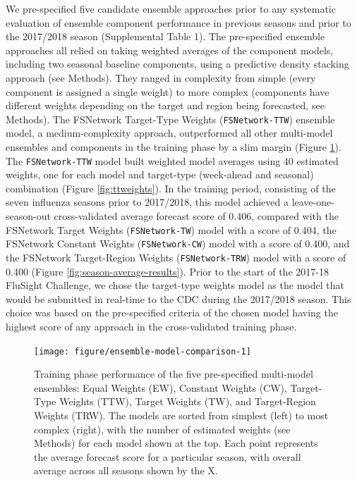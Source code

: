 \documentclass{article}\usepackage[]{graphicx}\usepackage[]{color}
\newenvironment{knitrout}{}{} %
\begin{document}
We pre-specified five candidate ensemble approaches prior to any systematic evaluation of ensemble component performance in previous seasons and prior to the 2017/2018 season (Supplemental Table 1).\cite{Reich2017github} 
The pre-specified ensemble approaches all relied on taking weighted averages of the component models, including two seasonal baseline components, using a predictive density stacking approach (see Methods).
They ranged in complexity from simple (every component is assigned a single weight) to more complex (components have different weights depending on the target and region being forecasted, see Methods).
The FSNetwork Target-Type Weights ({\tt FSNetwork-TTW}) ensemble model, a medium-complexity approach, outperformed all other multi-model ensembles and components in the training phase by a slim margin (Figure \ref{fig:ensemble-model-comparison}). 
The {\tt FSNetwork-TTW} model built weighted model averages using 40 estimated weights, one for each model and target-type (week-ahead and seasonal) combination (Figure \ref{fig:ttweights}).
In the training period, consisting of the seven influenza seasons prior to 2017/2018, this model achieved a leave-one-season-out cross-validated average forecast score of 
0.406, 
compared with 
the FSNetwork Target Weights ({\tt FSNetwork-TW}) model with a score of 0.404, 
the FSNetwork Constant Weights ({\tt FSNetwork-CW}) model with a score of 0.400, and 
the FSNetwork Target-Region Weights ({\tt FSNetwork-TRW}) model with a score of 0.400 (Figure \ref{fig:season-average-results}).
Prior to the start of the 2017-18 FluSight Challenge, we chose the target-type weights model as the model that would be submitted in real-time to the CDC during the 2017/2018 season. 
This choice was based on the pre-specified criteria of the chosen model having the highest score of any approach in the cross-validated training phase.\cite{Reich2017github}

\begin{knitrout}
\color{fgcolor}\begin{figure}
\texttt{[image: figure/ensemble-model-comparison-1]} \caption[Training phase performance of the five pre-specified multi-model ensembles]{Training phase performance of the five pre-specified multi-model ensembles: Equal Weights (EW), Constant Weights (CW), Target-Type Weights (TTW), Target Weights (TW), and Target-Region Weights (TRW). The models are sorted from simplest (left) to most complex (right), with the number of estimated weights (see Methods) for each model shown at the top. Each point represents the average forecast score for a particular season, with overall average across all seasons shown by the X. }\label{fig:ensemble-model-comparison}
\end{figure}


\end{knitrout}
\end{document}
